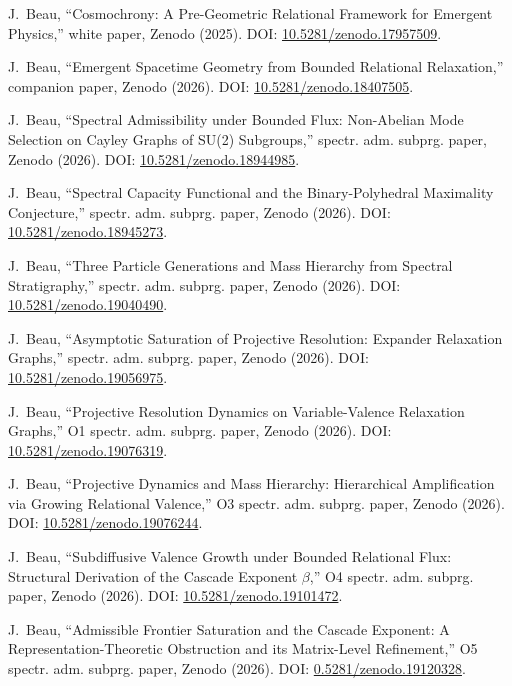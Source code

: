 J.~Beau,
``Cosmochrony: A Pre-Geometric Relational Framework for Emergent Physics,''
white paper, Zenodo (2025).
DOI: \href{https://doi.org/10.5281/zenodo.17957509}{10.5281/zenodo.17957509}.

J.~Beau,
``Emergent Spacetime Geometry from Bounded Relational Relaxation,''
companion paper, Zenodo (2026).
DOI: \href{https://doi.org/10.5281/zenodo.18407505}{10.5281/zenodo.18407505}.

J.~Beau,
``Spectral Admissibility under Bounded Flux: Non-Abelian Mode Selection on Cayley Graphs of SU(2) Subgroups,''
spectr. adm. subprg. paper, Zenodo (2026).
DOI: \href{https://doi.org/10.5281/zenodo.18944985}{10.5281/zenodo.18944985}.

J.~Beau,
``Spectral Capacity Functional and the Binary-Polyhedral Maximality Conjecture,''
spectr. adm. subprg. paper, Zenodo (2026).
DOI: \href{https://doi.org/10.5281/zenodo.18945273}{10.5281/zenodo.18945273}.

J.~Beau,
``Three Particle Generations and Mass Hierarchy from Spectral Stratigraphy,''
spectr. adm. subprg. paper, Zenodo (2026).
DOI: \href{https://doi.org/10.5281/zenodo.19040490}{10.5281/zenodo.19040490}.

J.~Beau,
``Asymptotic Saturation of Projective Resolution: Expander Relaxation Graphs,''
spectr. adm. subprg. paper, Zenodo (2026).
DOI: \href{https://doi.org/10.5281/zenodo.19056975}{10.5281/zenodo.19056975}.

J.~Beau,
``Projective Resolution Dynamics on Variable-Valence Relaxation Graphs,''
O1 spectr. adm. subprg. paper, Zenodo (2026).
DOI: \href{https://doi.org/10.5281/zenodo.19076319}{10.5281/zenodo.19076319}.

J.~Beau,
``Projective Dynamics and Mass Hierarchy: Hierarchical Amplification via Growing Relational Valence,''
O3 spectr. adm. subprg. paper, Zenodo (2026).
DOI: \href{https://doi.org/10.5281/zenodo.19076244}{10.5281/zenodo.19076244}.

J.~Beau,
``Subdiffusive Valence Growth under Bounded Relational Flux: Structural Derivation of the Cascade Exponent $\beta$,''
O4 spectr. adm. subprg. paper, Zenodo (2026).
DOI: \href{https://doi.org/10.5281/zenodo.19101472}{10.5281/zenodo.19101472}.

J.~Beau,
``Admissible Frontier Saturation and the Cascade Exponent: A Representation-Theoretic Obstruction and its Matrix-Level
Refinement,''
O5 spectr. adm. subprg. paper, Zenodo (2026).
DOI: \href{https://doi.org/10.5281/zenodo.19120328}{0.5281/zenodo.19120328}.

